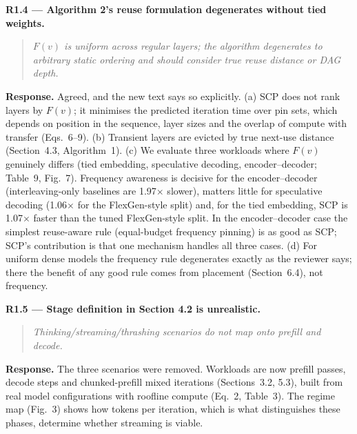 \documentclass[11pt]{article}
\newcommand{\rc}[1]{\par\medskip\noindent\textbf{#1}}
\newenvironment{comment}{\begin{quote}\itshape}{\end{quote}}
\begin{document}
\rc{R1.4 --- Algorithm 2's reuse formulation degenerates without tied weights.}
\begin{comment}$F(v)$ is uniform across regular layers; the algorithm degenerates to arbitrary static ordering and should consider true reuse distance or DAG depth.\end{comment}
\textbf{Response.} Agreed, and the new text says so explicitly. (a) SCP does not rank layers by $F(v)$; it minimises the predicted iteration time over pin sets, which depends on position in the sequence, layer sizes and the overlap of compute with transfer (Eqs.~6--9). (b) Transient layers are evicted by true next-use distance (Section~4.3, Algorithm~1). (c) We evaluate three workloads where $F(v)$ genuinely differs (tied embedding, speculative decoding, encoder--decoder; Table~9, Fig.~7). Frequency awareness is decisive for the encoder--decoder (interleaving-only baselines are 1.97$\times$ slower), matters little for speculative decoding (1.06$\times$ for the FlexGen-style split) and, for the tied embedding, SCP is 1.07$\times$ faster than the tuned FlexGen-style split. In the encoder--decoder case the simplest reuse-aware rule (equal-budget frequency pinning) is as good as SCP; SCP's contribution is that one mechanism handles all three cases. (d) For uniform dense models the frequency rule degenerates exactly as the reviewer says; there the benefit of any good rule comes from placement (Section~6.4), not frequency.

\rc{R1.5 --- Stage definition in Section 4.2 is unrealistic.}
\begin{comment}Thinking/streaming/thrashing scenarios do not map onto prefill and decode.\end{comment}
\textbf{Response.} The three scenarios were removed. Workloads are now prefill passes, decode steps and chunked-prefill mixed iterations (Sections~3.2, 5.3), built from real model configurations with roofline compute (Eq.~2, Table~3). The regime map (Fig.~3) shows how tokens per iteration, which is what distinguishes these phases, determine whether streaming is viable.
\end{document}
